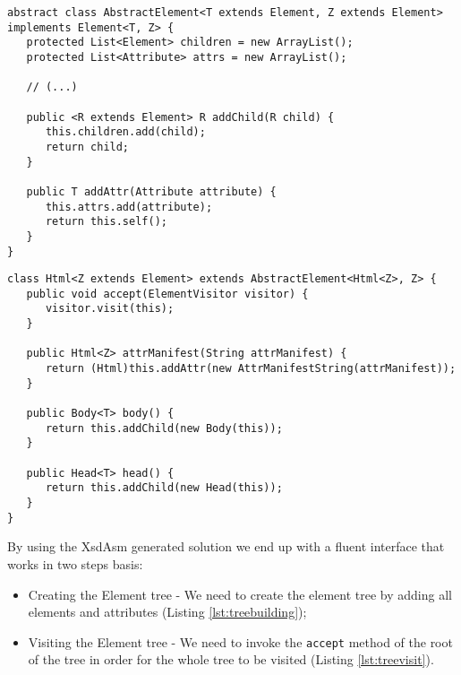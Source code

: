 \bigskip


\begin{minipage}{\linewidth}
\begin{lstlisting}[caption={AbstractElement generated by XsdAsm},label={lst:abstractelementasm}]
abstract class AbstractElement<T extends Element, Z extends Element> implements Element<T, Z> {
   protected List<Element> children = new ArrayList();
   protected List<Attribute> attrs = new ArrayList();

   // (...)

   public <R extends Element> R addChild(R child) {
      this.children.add(child);
      return child;
   }

   public T addAttr(Attribute attribute) {
      this.attrs.add(attribute);
      return this.self();
   }
}
\end{lstlisting}
\end{minipage}

\bigskip


\begin{minipage}{\linewidth}
\begin{lstlisting}[caption={Html class generated by XsdAsm},label={lst:htmlasm}]
class Html<Z extends Element> extends AbstractElement<Html<Z>, Z> {
   public void accept(ElementVisitor visitor) {
      visitor.visit(this);
   }

   public Html<Z> attrManifest(String attrManifest) {
      return (Html)this.addAttr(new AttrManifestString(attrManifest));
   }
   
   public Body<T> body() {
      return this.addChild(new Body(this));
   }
   
   public Head<T> head() {
      return this.addChild(new Head(this));
   }
}
\end{lstlisting}
\end{minipage}

\noindent
By using the XsdAsm generated solution we end up with a fluent interface that works in two steps basis:

\begin{itemize}  
	\item Creating the Element tree - We need to create the element tree by adding all elements and attributes (Listing \ref{lst:treebuilding});
	\item Visiting the Element tree - We need to invoke the \texttt{accept} method of the root of the tree in order for the whole tree to be visited (Listing \ref{lst:treevisit}).
\end{itemize}

